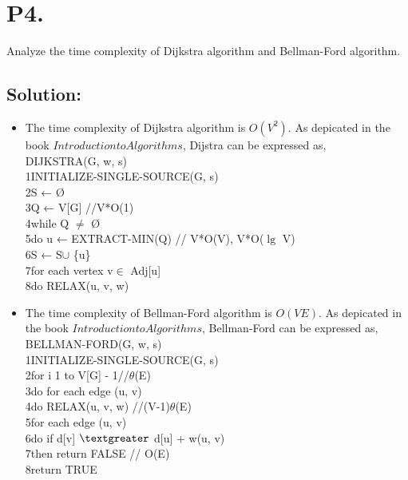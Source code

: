 \documentclass{article}
\theoremstyle{definition}
\theoremstyle{definition}
\theoremstyle{remark}
\begin{document}
\section*{P4.}
Analyze the time complexity of Dijkstra algorithm and Bellman-Ford algorithm.
\subsection*{Solution:}
\begin{itemize}
\item The time complexity of Dijkstra algorithm is $O(V^2)$. As depicated in the book $Introduction to Algorithms$, Dijstra can be expressed as,\\

DIJKSTRA(G, w, s)\\
1\quad  INITIALIZE-SINGLE-SOURCE(G, s)\\
2\quad  S ← Ø\\
3\quad  Q ← V[G]               \quad \quad   //V*O(1)\\
4\quad  while Q $\neq$ Ø \\
5\quad \quad      do u ← EXTRACT-MIN(Q)  \quad \quad    // V*O(V), V*O($\lg$ V)\\
6\quad \quad \quad        S ← S$\cup$ \{u\}\\
7\quad \quad \quad       for each vertex v$\in$ Adj[u]\\
8\quad\quad  \quad\quad           do RELAX(u, v, w) \\

\item The time complexity of Bellman-Ford algorithm is $O(VE)$. As depicated in the book $Introduction to Algorithms$, Bellman-Ford can be expressed as,\\

BELLMAN-FORD(G, w, s)\\
1\quad   INITIALIZE-SINGLE-SOURCE(G, s)\\
2\quad   for i  1 to V[G] - 1\quad \quad  //$\theta$(E)\\
3\quad \quad       do for each edge (u, v)  \\
4\quad \quad\quad            do RELAX(u, v, w) \quad \quad //(V-1)$\theta$(E)\\
5\quad   for each edge (u, v)  \\
6\quad  \quad      do if d[v] $\textgreater$ d[u] + w(u, v) \\
7\quad  \quad\quad           then return FALSE \quad \quad // O(E)\\
8\quad   return TRUE\\

\end{itemize}
\end{document}
